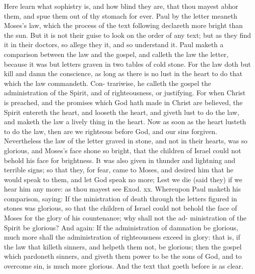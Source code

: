 \documentclass{custom}
\begin{document}
Here learn what sophistry is, and how blind they are, 
that thou mayest abhor them, and spue them out of thy 
stomach for ever. Paul by the letter meaneth Moses's 
law, which the process of the text following declareth 
more bright than the sun. But it is not their guise to 
look on the order of any text; but as they find it in their 
doctors, so allege they it, and so understand it. Paul 
maketh a comparison between the law and the gospel, 
and calleth the law the letter, because it was but letters 
graven in two tables of cold stone. For the law doth but 
kill and damn the conscience, as long as there is no lust 
in the heart to do that which the law commandeth. Con- 
trariwise, he calleth the gospel the administration of the 
Spirit, and of righteousness, or justifying. For when 
Christ is preached, and the promises which God hath 
made in Christ are believed, the Spirit entereth the heart, 
and looseth the heart, and giveth lust to do the law, and 
maketh the law a lively thing in the heart. Now as soon 
as the heart lusteth to do the law, then are we righteous 
before God, and our sins forgiven. Nevertheless the law 
of the letter graved in stone, and not in their hearts, was 
so glorious, and Moses's face shone so bright, that the 
children of Israel could not behold his face for brightness. 
It was also given in thunder and lightning and terrible 
signs; so that they, for fear, came to Moses, and desired 
him that he would speak to them, and let God speak no 
more; Lest we die (said they) if we hear him any more: 
as thou mayest see Exod. xx. Whereupon Paul maketh 
his comparison, saying: If the ministration of death 
through the letters figured in stones was glorious, so that 
the children of Israel could not behold the face of Moses 
for the glory of his countenance; why shall not the ad- 
ministration of the Spirit be glorious? And again: If 
the administration of damnation be glorious, much more 
shall the administration of righteousness exceed in glory: 
that is, if the law that killeth sinners, and helpeth them 
not, be glorious; then the gospel which pardoneth 
sinners, and giveth them power to be the sons of God, 
and to overcome sin, is much more glorious. And the 
text that goeth before is as clear. 
\end{document}

